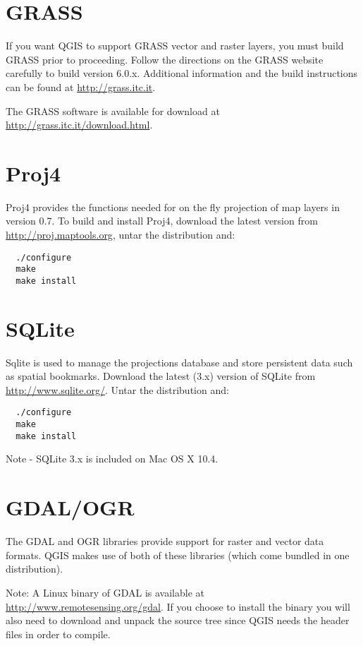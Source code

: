 \section{GRASS}
If you want QGIS to support GRASS vector and raster layers, you must build GRASS prior to proceeding. 
Follow the directions on the GRASS website carefully to build version 6.0.x. Additional information and the build instructions can be found at \url{http://grass.itc.it}.
 
The GRASS software is available for download at \url{http://grass.itc.it/download.html}.
\section{Proj4}
Proj4 provides the functions needed for on the fly projection of map layers in version 0.7. To build and install Proj4, download the latest version from \url{http://proj.maptools.org}, untar the distribution and:
\begin{verbatim}
  ./configure
  make
  make install
\end{verbatim}
\section{SQLite}
Sqlite is used to manage the projections database and store persistent data such as spatial bookmarks. Download the latest (3.x) version of SQLite from \url{http://www.sqlite.org/}. Untar the distribution and:
\begin{verbatim}
  ./configure
  make
  make install
\end{verbatim}
Note - SQLite 3.x is included on Mac OS X 10.4.
\section{GDAL/OGR}
  The GDAL and OGR libraries provide support for raster and vector data formats. QGIS makes use of both of these libraries (which come bundled in one distribution).

  Note: A Linux binary of GDAL is available at \url{http://www.remotesensing.org/gdal}. If you choose to install the binary you will also need to download and unpack the source tree since QGIS needs the header files in order to compile.
  
